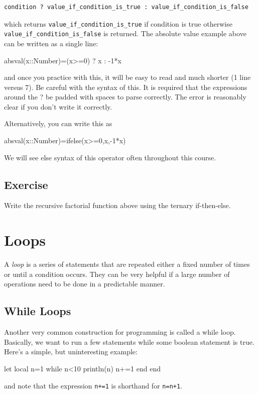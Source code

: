 \begin{verbatim}
condition ? value_if_condition_is_true : value_if_condition_is_false
\end{verbatim}
%
which returns \verb!value_if_condition_is_true! if condition is true otherwise\\ \verb!value_if_condition_is_false! is returned. The absolute value example above can be written as a single line:

\begin{jlblock}
absval(x::Number)=(x>=0) ? x : -1*x
\end{jlblock}
%
and once you practice with this, it will be easy to read and much shorter (1 line versus 7).  Be careful with the syntax of this.  It is required that the expressions around the ? be padded with spaces to parse correctly.  The error is reasonably clear if you don't write it correctly.  


Alternatively, you can write this as
%
\begin{jlblock}
absval(x::Number)=ifelse(x>=0,x,-1*x)
\end{jlblock}

We will see else syntax of this operator often throughout this course.

\subsection{Exercise}

Write the recursive factorial function above using the ternary if-then-else.  


\section{Loops}

A \emph{loop} is a series of statements that are repeated either a fixed
number of times or until a condition occurs. They can be very helpful if
a large number of operations need to be done in a predictable manner.


\subsection{While Loops}

Another very common construction for programming is called a while loop.
Basically, we want to run a few statements while some boolean statement
is true. Here's a simple, but uninteresting example:

\begin{jlblock}[bool]
let
  local n=1
  while n<10
    println(n)
    n+=1
  end
end
\end{jlblock}
%
and note that the expression \verb!n+=1! is shorthand for \verb!n=n+1!. 

